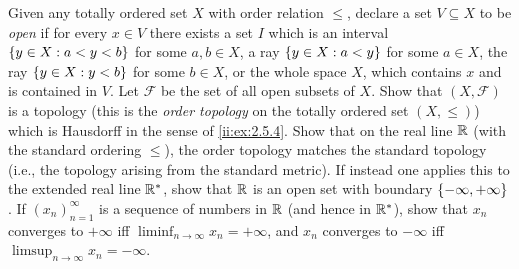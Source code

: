 \begin{ex}\label{ii:ex:2.5.5}
  Given any totally ordered set \(X\) with order relation \(\leq\), declare a set \(V \subseteq X\) to be \emph{open} if for every \(x \in V\) there exists a set \(I\) which is an interval \(\left\lbrace y \in X : a < y < b\right\rbrace\) for some \(a, b \in X\), a ray \(\left\lbrace y \in X : a < y\right\rbrace\) for some \(a \in X\), the ray \(\left\lbrace y \in X : y < b\right\rbrace\) for some \(b \in X\), or the whole space \(X\), which contains \(x\) and is contained in \(V\).
  Let \(\mathcal{F}\) be the set of all open subsets of \(X\).
  Show that \((X, \mathcal{F})\) is a topology (this is the \emph{order topology} on the totally ordered set \((X, \leq)\)) which is Hausdorff in the sense of \cref{ii:ex:2.5.4}.
  Show that on the real line \(\mathbb{R}\) (with the standard ordering \(\leq\)), the order topology matches the standard topology (i.e., the topology arising from the standard metric).
  If instead one applies this to the extended real line \(\mathbb{R}^*\), show that \(\mathbb{R}\) is an open set with boundary \(\left\lbrace-\infty, +\infty\right\rbrace\).
  If \((x_n)_{n = 1}^\infty\) is a sequence of numbers in \(\mathbb{R}\) (and hence in \(\mathbb{R}^*\)), show that \(x_n\) converges to \(+\infty\) iff \(\liminf_{n \to \infty} x_n = +\infty\), and \(x_n\) converges to \(-\infty\) iff \(\limsup_{n \to \infty} x_n = -\infty\).
\end{ex}

